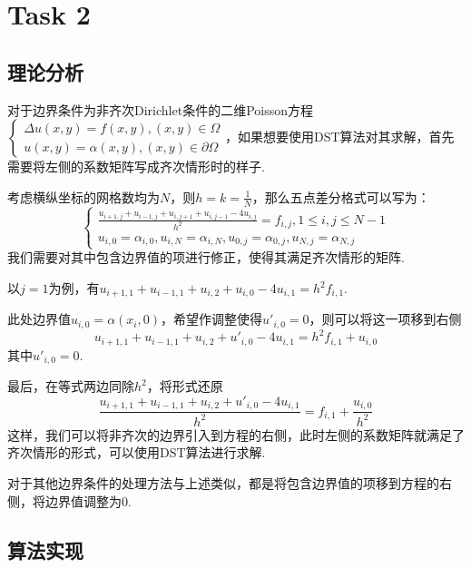 \documentclass[a4paper,11pt]{ctexart}
\begin{document}
\section{Task 2}

\subsection{理论分析}

对于边界条件为非齐次Dirichlet条件的二维Poisson方程$\begin{cases}
    \Delta u(x,y) = f(x,y), (x,y)\in \Omega\\
    u(x,y) = \alpha(x,y), (x,y)\in \partial\Omega
\end{cases}$，如果想要使用DST算法对其求解，首先需要将左侧的系数矩阵写成齐次情形时的样子.\par
考虑横纵坐标的网格数均为$N$，则$h=k=\frac{1}{N}$，那么五点差分格式可以写为：
\[\begin{cases}
\frac{u_{i+1,j}+u_{i-1,j}+u_{i,j+1}+u_{i,j-1}-4u_{i,j}}{h^2}=f_{i,j}, 1\leq i,j\leq N-1\\
u_{i,0}=\alpha_{i,0}, u_{i,N}=\alpha_{i,N}, u_{0,j}=\alpha_{0,j}, u_{N,j}=\alpha_{N,j}
\end{cases}\]
我们需要对其中包含边界值的项进行修正，使得其满足齐次情形的矩阵.\par
以$j=1$为例，有$u_{i+1,1}+u_{i-1,1}+u_{i,2}+u_{i,0}-4u_{i,1}=h^2 f_{i,1}$.\par
此处边界值$u_{i,0}=\alpha(x_i,0)$，希望作调整使得$u'_{i,0}=0$，则可以将这一项移到右侧
\[u_{i+1,1}+u_{i-1,1}+u_{i,2}+u'_{i,0}-4u_{i,1}=h^2 f_{i,1}+u_{i,0}\]
其中$u'_{i,0}=0$.\par
最后，在等式两边同除$h^2$，将形式还原
\[\frac{u_{i+1,1}+u_{i-1,1}+u_{i,2}+u'_{i,0}-4u_{i,1}}{h^2}=f_{i,1}+\frac{u_{i,0}}{h^2}\]
这样，我们可以将非齐次的边界引入到方程的右侧，此时左侧的系数矩阵就满足了齐次情形的形式，可以使用DST算法进行求解.\par
对于其他边界条件的处理方法与上述类似，都是将包含边界值的项移到方程的右侧，将边界值调整为0.

\subsection{算法实现}
\end{document}
